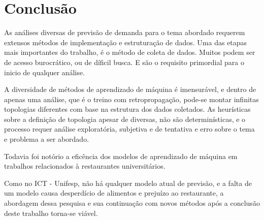 \documentclass[	12pt, Times, openright, twoside, a4paper, english, brazil]{abntex2}
\begin{document}
	
	

  \chapter{Conclusão}
    As análises diversas de previsão de demanda para o tema abordado requerem extensos métodos de implementação e estruturação de dados.
    Uma das etapas mais importantes do trabalho, é o método de coleta de dados. Muitos podem ser de acesso burocrático, ou de díficil busca. E são o requisito primordial para o inicio de qualquer análise.
    
    A diversidade de métodos de aprendizado de máquina é imensurável, e dentro de apenas uma análise, que é o treino com retropropagação, pode-se montar infinitas topologias diferentes com base na estrutura dos dados coletados. 
    As heurísticas sobre a definição de topologia apesar de diversas, não são determinísticas, e o processo requer análise exploratória, subjetiva e de tentativa e erro sobre o tema e problema a ser abordado.
    
    Todavia foi notório a eficência dos modelos de aprendizado de máquina em trabalhos relacionados à restaurantes universitários. 
    
    Como no ICT - Unifesp, não há qualquer modelo atual de previsão, e a falta de um modelo causa desperdício de alimentos e prejuízo ao restaurante, a abordagem dessa pesquisa e sua continuação com novos métodos após a conclusão deste trabalho torna-se viável.


\end{document}
